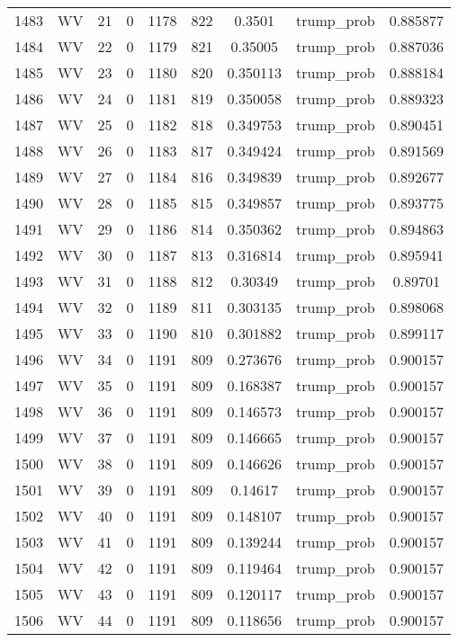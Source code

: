 \documentclass[12pt,a4paper]{article}
\begin{document}
\begin{tabular}{r|cccccccc}
	1483 & WV & 21 & 0 & 1178 & 822 & 0.3501 & trump\_prob & 0.885877 \\
	1484 & WV & 22 & 0 & 1179 & 821 & 0.35005 & trump\_prob & 0.887036 \\
	1485 & WV & 23 & 0 & 1180 & 820 & 0.350113 & trump\_prob & 0.888184 \\
	1486 & WV & 24 & 0 & 1181 & 819 & 0.350058 & trump\_prob & 0.889323 \\
	1487 & WV & 25 & 0 & 1182 & 818 & 0.349753 & trump\_prob & 0.890451 \\
	1488 & WV & 26 & 0 & 1183 & 817 & 0.349424 & trump\_prob & 0.891569 \\
	1489 & WV & 27 & 0 & 1184 & 816 & 0.349839 & trump\_prob & 0.892677 \\
	1490 & WV & 28 & 0 & 1185 & 815 & 0.349857 & trump\_prob & 0.893775 \\
	1491 & WV & 29 & 0 & 1186 & 814 & 0.350362 & trump\_prob & 0.894863 \\
	1492 & WV & 30 & 0 & 1187 & 813 & 0.316814 & trump\_prob & 0.895941 \\
	1493 & WV & 31 & 0 & 1188 & 812 & 0.30349 & trump\_prob & 0.89701 \\
	1494 & WV & 32 & 0 & 1189 & 811 & 0.303135 & trump\_prob & 0.898068 \\
	1495 & WV & 33 & 0 & 1190 & 810 & 0.301882 & trump\_prob & 0.899117 \\
	1496 & WV & 34 & 0 & 1191 & 809 & 0.273676 & trump\_prob & 0.900157 \\
	1497 & WV & 35 & 0 & 1191 & 809 & 0.168387 & trump\_prob & 0.900157 \\
	1498 & WV & 36 & 0 & 1191 & 809 & 0.146573 & trump\_prob & 0.900157 \\
	1499 & WV & 37 & 0 & 1191 & 809 & 0.146665 & trump\_prob & 0.900157 \\
	1500 & WV & 38 & 0 & 1191 & 809 & 0.146626 & trump\_prob & 0.900157 \\
	1501 & WV & 39 & 0 & 1191 & 809 & 0.14617 & trump\_prob & 0.900157 \\
	1502 & WV & 40 & 0 & 1191 & 809 & 0.148107 & trump\_prob & 0.900157 \\
	1503 & WV & 41 & 0 & 1191 & 809 & 0.139244 & trump\_prob & 0.900157 \\
	1504 & WV & 42 & 0 & 1191 & 809 & 0.119464 & trump\_prob & 0.900157 \\
	1505 & WV & 43 & 0 & 1191 & 809 & 0.120117 & trump\_prob & 0.900157 \\
	1506 & WV & 44 & 0 & 1191 & 809 & 0.118656 & trump\_prob & 0.900157 \\

\end{tabular}
\end{document}
